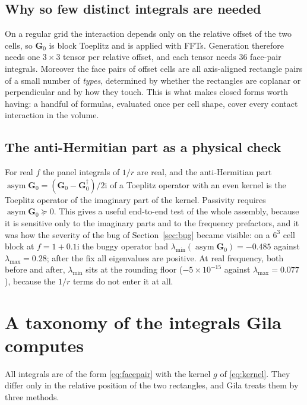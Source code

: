 \documentclass[11pt]{article}
\theoremstyle{remark}
\newcommand{\ii}{\mathrm{i}}
\begin{document}
\subsection{Why so few distinct integrals are needed}

On a regular grid the interaction depends only on the relative offset of the two
cells, so $\mathbf{G}_0$ is block Toeplitz and is applied with FFTs. Generation
therefore needs one $3\times 3$ tensor per relative offset, and each tensor needs 36
face-pair integrals. Moreover the face pairs of offset cells are all axis-aligned
rectangle pairs of a small number of \emph{types}, determined by whether the
rectangles are coplanar or perpendicular and by how they touch. This is what makes
closed forms worth having: a handful of formulas, evaluated once per cell shape,
cover every contact interaction in the volume.

\subsection{The anti-Hermitian part as a physical check}
\label{sec:asym}

For real $f$ the panel integrals of $1/r$ are real, and the anti-Hermitian part
$\operatorname{asym}\mathbf{G}_0 = (\mathbf{G}_0 - \mathbf{G}_0^\dagger)/2\ii$ of a
Toeplitz operator with an even kernel is the Toeplitz operator of the imaginary part
of the kernel. Passivity requires $\operatorname{asym}\mathbf{G}_0 \succeq 0$. This
gives a useful end-to-end test of the whole assembly, because it is sensitive only to
the imaginary parts and to the frequency prefactors, and it was how the severity of
the bug of Section~\ref{sec:bug} became visible: on a $6^3$ cell block at
$f = 1 + 0.1\ii$ the buggy operator had $\lambda_{\min}(\operatorname{asym}\mathbf{G}_0)
= -0.485$ against $\lambda_{\max} = 0.28$; after the fix all eigenvalues are positive.
At real frequency, both before and after, $\lambda_{\min}$ sits at the rounding floor
($-5\times 10^{-15}$ against $\lambda_{\max} = 0.077$), because the $1/r$ terms do not
enter it at all.

\section{A taxonomy of the integrals Gila computes}
\label{sec:taxonomy}

All integrals are of the form \eqref{eq:facepair} with the kernel $g$ of
\eqref{eq:kernel}. They differ only in the relative position of the two rectangles,
and Gila treats them by three methods.
\end{document}
